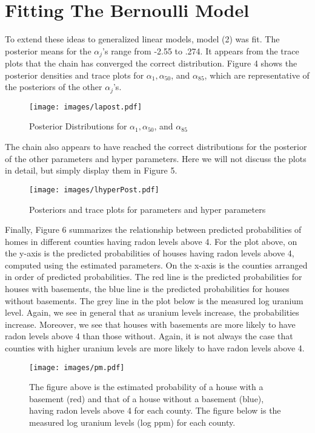 \documentclass{article}
\def\beginmyfig{\begin{figure}[htbp]\begin{center}}
\def\endmyfig{\end{center}\end{figure}}
\begin{document}


\section{Fitting The Bernoulli Model}
To extend these ideas to generalized linear models, model (2) was fit. 
The posterior means for the $\alpha_j$'s range from -2.55 to .274. It appears from the trace
plots that the chain has converged the correct distribution. Figure 4 shows the posterior
densities and trace plots for $\alpha_1,\alpha_{50}$, and $\alpha_{85}$, which are representative
of the posteriors of the other $\alpha_j$'s.\\
\beginmyfig \texttt{[image: images/lapost.pdf]} 
            \caption{Posterior Distributions for $\alpha_1,\alpha_{50}$, and $\alpha_{85}$} \endmyfig 
\noindent
The chain also appears to have reached the correct distributions for the posterior of the other parameters
and hyper parameters. Here we will not discuss the plots in detail, but simply display them in Figure 5.\\
\beginmyfig \texttt{[image: images/lhyperPost.pdf]} 
            \caption{Posteriors and trace plots for parameters and hyper parameters}\endmyfig 
Finally, Figure 6 summarizes the relationship between predicted probabilities
of homes in different counties having radon levels above 4.  For the plot
above, on the y-axis is the predicted probabilities of houses having radon
levels above 4, computed using the estimated parameters. On the x-axis is the
counties arranged in order of predicted probabilities. The red line is the
predicted probabilities for houses with basements, the blue line is the
predicted probabilities for houses without basements. The grey line in the plot
below is the measured log uranium level. Again, we see in general that as
uranium levels increase, the probabilities increase. Moreover, we see that
houses with basements are more likely to have radon levels above 4 than those
without. Again, it is not always the case that counties with higher uranium
levels are more likely to have radon levels above 4.\\

\beginmyfig \texttt{[image: images/pm.pdf]}  
            \caption{The figure above is the estimated probability of a house
            with a basement (red) and that of a house without a basement
            (blue), having radon levels above 4 for each county. The figure
            below is the measured log uranium levels (log ppm) for each
            county.}\endmyfig 
\end{document}
